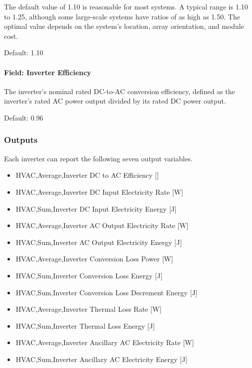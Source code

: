 The default value of 1.10 is reasonable for most systems. A typical
range is 1.10 to 1.25, although some large-scale systems have ratios of
as high as 1.50. The optimal value depends on the system's location,
array orientation, and module cost.

Default: 1.10

\paragraph{Field: Inverter Efficiency}\label{field-inverter-efficiency-electricloadcenterinverterpvwatts}

The inverter's nominal rated DC-to-AC conversion efficiency, defined as
the inverter's rated AC power output divided by its rated DC power
output.

Default: 0.96

\subsubsection{Outputs}\label{outputs-3-005}

Each inverter can report the following seven output variables.

\begin{itemize}
\tightlist
\item
  HVAC,Average,Inverter DC to AC Efficiency {[]}
\item
  HVAC,Average,Inverter DC Input Electricity Rate {[}W{]}
\item
  HVAC,Sum,Inverter DC Input Electricity Energy {[}J{]}
\item
  HVAC,Average,Inverter AC Output Electricity Rate {[}W{]}
\item
  HVAC,Sum,Inverter AC Output Electricity Energy {[}J{]}
\item
  HVAC,Average,Inverter Conversion Loss Power {[}W{]}
\item
  HVAC,Sum,Inverter Conversion Loss Energy {[}J{]}
\item
  HVAC,Sum,Inverter Conversion Loss Decrement Energy {[}J{]}
\item
  HVAC,Average,Inverter Thermal Loss Rate {[}W{]}
\item
  HVAC,Sum,Inverter Thermal Loss Energy {[}J{]}
\item
  HVAC,Average,Inverter Ancillary AC Electricity Rate {[}W{]}
\item
  HVAC,Sum,Inverter Ancillary AC Electricity Energy {[}J{]}
\end{itemize}

